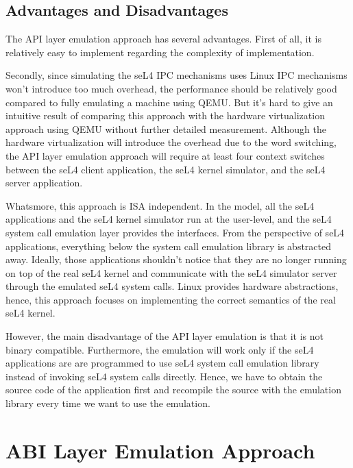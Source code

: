 \subsection{Advantages and Disadvantages}

The API layer emulation approach has several advantages. First of all, it is relatively easy to implement regarding the complexity of implementation.


Secondly, since simulating the seL4 IPC mechanisms uses Linux IPC mechanisms won't introduce too much overhead, the performance should be relatively good compared to fully emulating a machine using QEMU. But it's hard to give an intuitive result of comparing this approach with the hardware virtualization approach using QEMU without further detailed measurement. Although the hardware virtualization will introduce the overhead due to the word switching, the API layer emulation approach will require at least four context switches between the seL4 client application, the seL4 kernel simulator, and the seL4 server application.

Whatsmore, this approach is ISA independent. In the model, all the seL4 applications and the seL4 kernel simulator run at the user-level, and the seL4 system call emulation layer provides the interfaces. From the perspective of seL4 applications, everything below the system call emulation library is abstracted away. Ideally, those applications shouldn't notice that they are no longer running on top of the real seL4 kernel and communicate with the seL4 simulator server through the emulated seL4 system calls. Linux provides hardware abstractions, hence, this approach focuses on implementing the correct semantics of the real seL4 kernel.

However, the main disadvantage of the API layer emulation is that it is not binary compatible. Furthermore, the emulation will work only if the seL4 applications are are programmed to use seL4 system call emulation library instead of invoking seL4 system calls directly. Hence, we have to obtain the source code of the application first and recompile the source with the emulation library every time we want to use the emulation.    

\section{ABI Layer Emulation Approach}

